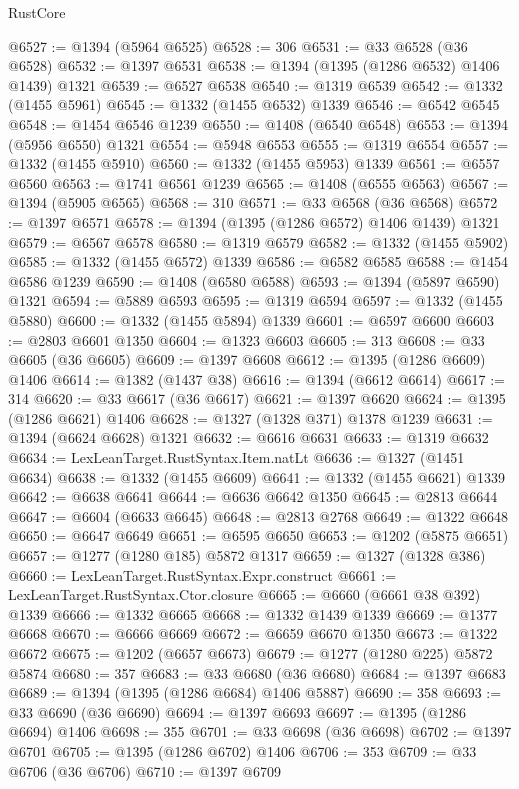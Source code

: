 \begin{lexlean}{RustCore}
\begin{coremodule}
@6527 := @1394 (@5964 @6525)
@6528 := 306
@6531 := @33 @6528 (@36 @6528)
@6532 := @1397 @6531
@6538 := @1394 (@1395 (@1286 @6532) @1406 @1439) @1321
@6539 := @6527 @6538
@6540 := @1319 @6539
@6542 := @1332 (@1455 @5961)
@6545 := @1332 (@1455 @6532) @1339
@6546 := @6542 @6545
@6548 := @1454 @6546 @1239
@6550 := @1408 (@6540 @6548)
@6553 := @1394 (@5956 @6550) @1321
@6554 := @5948 @6553
@6555 := @1319 @6554
@6557 := @1332 (@1455 @5910)
@6560 := @1332 (@1455 @5953) @1339
@6561 := @6557 @6560
@6563 := @1741 @6561 @1239
@6565 := @1408 (@6555 @6563)
@6567 := @1394 (@5905 @6565)
@6568 := 310
@6571 := @33 @6568 (@36 @6568)
@6572 := @1397 @6571
@6578 := @1394 (@1395 (@1286 @6572) @1406 @1439) @1321
@6579 := @6567 @6578
@6580 := @1319 @6579
@6582 := @1332 (@1455 @5902)
@6585 := @1332 (@1455 @6572) @1339
@6586 := @6582 @6585
@6588 := @1454 @6586 @1239
@6590 := @1408 (@6580 @6588)
@6593 := @1394 (@5897 @6590) @1321
@6594 := @5889 @6593
@6595 := @1319 @6594
@6597 := @1332 (@1455 @5880)
@6600 := @1332 (@1455 @5894) @1339
@6601 := @6597 @6600
@6603 := @2803 @6601 @1350
@6604 := @1323 @6603
@6605 := 313
@6608 := @33 @6605 (@36 @6605)
@6609 := @1397 @6608
@6612 := @1395 (@1286 @6609) @1406
@6614 := @1382 (@1437 @38)
@6616 := @1394 (@6612 @6614)
@6617 := 314
@6620 := @33 @6617 (@36 @6617)
@6621 := @1397 @6620
@6624 := @1395 (@1286 @6621) @1406
@6628 := @1327 (@1328 @371) @1378 @1239
@6631 := @1394 (@6624 @6628) @1321
@6632 := @6616 @6631
@6633 := @1319 @6632
@6634 := LexLeanTarget.RustSyntax.Item.natLt
@6636 := @1327 (@1451 @6634)
@6638 := @1332 (@1455 @6609)
@6641 := @1332 (@1455 @6621) @1339
@6642 := @6638 @6641
@6644 := @6636 @6642 @1350
@6645 := @2813 @6644
@6647 := @6604 (@6633 @6645)
@6648 := @2813 @2768
@6649 := @1322 @6648
@6650 := @6647 @6649
@6651 := @6595 @6650
@6653 := @1202 (@5875 @6651)
@6657 := @1277 (@1280 @185) @5872 @1317
@6659 := @1327 (@1328 @386)
@6660 := LexLeanTarget.RustSyntax.Expr.construct
@6661 := LexLeanTarget.RustSyntax.Ctor.closure
@6665 := @6660 (@6661 @38 @392) @1339
@6666 := @1332 @6665
@6668 := @1332 @1439 @1339
@6669 := @1377 @6668
@6670 := @6666 @6669
@6672 := @6659 @6670 @1350
@6673 := @1322 @6672
@6675 := @1202 (@6657 @6673)
@6679 := @1277 (@1280 @225) @5872 @5874
@6680 := 357
@6683 := @33 @6680 (@36 @6680)
@6684 := @1397 @6683
@6689 := @1394 (@1395 (@1286 @6684) @1406 @5887)
@6690 := 358
@6693 := @33 @6690 (@36 @6690)
@6694 := @1397 @6693
@6697 := @1395 (@1286 @6694) @1406
@6698 := 355
@6701 := @33 @6698 (@36 @6698)
@6702 := @1397 @6701
@6705 := @1395 (@1286 @6702) @1406
@6706 := 353
@6709 := @33 @6706 (@36 @6706)
@6710 := @1397 @6709

\end{coremodule}
\end{lexlean}
